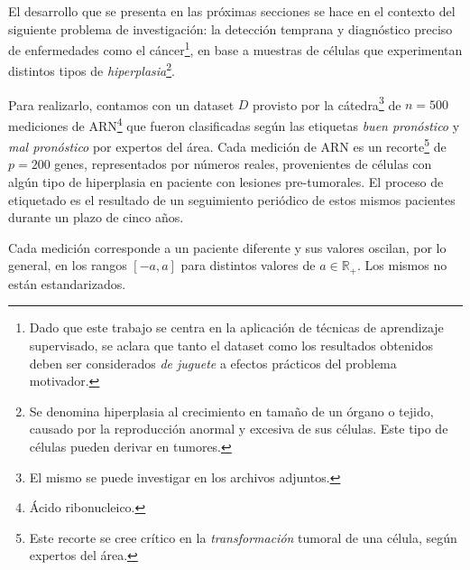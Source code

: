 El desarrollo que se presenta en las próximas secciones se hace en el contexto del siguiente problema de investigación: la detección temprana y diagnóstico preciso de enfermedades como el cáncer\footnote{Dado que este trabajo se centra en la aplicación de técnicas de aprendizaje supervisado, se aclara que tanto el dataset como los resultados obtenidos deben ser considerados \textit{de juguete} a efectos prácticos del problema motivador.}, en base a muestras de células que experimentan distintos tipos de \textit{hiperplasia}\footnote{Se denomina hiperplasia al crecimiento en tamaño de un órgano o tejido, causado por la reproducción anormal y excesiva de sus células. Este tipo de células pueden derivar en tumores.}. 

Para realizarlo, contamos con un dataset $D$ provisto por la cátedra\footnote{El mismo se puede investigar en los archivos adjuntos.} de $n=500$ mediciones de ARN\footnote{Ácido ribonucleico.} que fueron clasificadas según las etiquetas \textit{buen pronóstico} y \textit{mal pronóstico} por expertos del área. Cada medición de ARN es un recorte\footnote{Este recorte se cree crítico en la \textit{transformación} tumoral de una célula, según expertos del área.} de $p=200$ genes, representados por números reales, provenientes de células con algún tipo de hiperplasia en paciente con lesiones pre-tumorales. El proceso de etiquetado es el resultado de un seguimiento periódico de estos mismos pacientes durante un plazo de cinco años.

Cada medición corresponde a un paciente diferente y sus valores oscilan, por lo general, en los rangos $[-a, a]$ para distintos valores de $a \in \mathbb{R_+}$. Los mismos no están estandarizados. 
